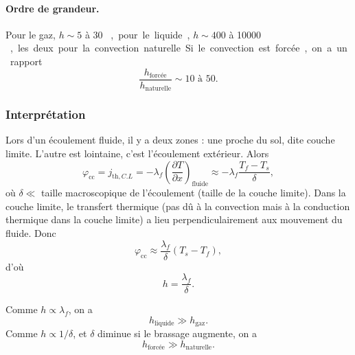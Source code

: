             \paragraph{Ordre de grandeur.} Pour le gaz, $h\sim 5$ à 30 \si[]{\watt\per\metre\square\per\kelvin}, pour le liquide, $h\sim 400$ à 10000 \si[]{\watt\per\metre\square\per\kelvin}, les deux pour la convection naturelle. Si le convection est forcée, on a un rapport 
            \begin{equation}
                \frac{h_{\text{forcée}}}{h_{\text{naturelle}}}\sim 10\text{ à }50.
            \end{equation}

        \subsubsection{Interprétation}

            Lors d'un écoulement fluide, il y a deux zones : une proche du sol, dite \og couche limite\fg. L'autre est lointaine, c'est l'écoulement extérieur. Alors
            \begin{equation}
                \varphi_{\text{cc}}=j_{\text{th},C.L}=-\lambda_f\left(\frac{\partial T}{\partial x}\right)_{\text{fluide}}\approx-\lambda_f\frac{T_f-T_s}{\delta},
            \end{equation}
            où $\delta\ll$ taille macroscopique de l'écoulement (taille de la couche limite). Dans la couche limite, le transfert thermique (pas dû à la convection mais à la conduction thermique dans la couche limite) a lieu perpendiculairement aux mouvement du fluide. Donc 
            \begin{equation}
                \varphi_{\text{cc}}\approx\frac{\lambda_f}{\delta}\left(T_s-T_f\right),
            \end{equation}
            d'où
            \begin{equation}
                \boxed{
                    h=\frac{\lambda_f}{\delta}.
                }
            \end{equation}

            Comme $h\propto\lambda_f$, on a 
            \begin{equation}
                \boxed{
                    h_{\text{liquide}}\gg h_{\text{gaz}}.
                }
            \end{equation}
            Comme $h\propto1/\delta$, et $\delta$ diminue si le brassage augmente, on a 
            \begin{equation}
                \boxed{
                    h_{\text{forcée}}\gg h_{\text{naturelle}}.
                }
            \end{equation}

